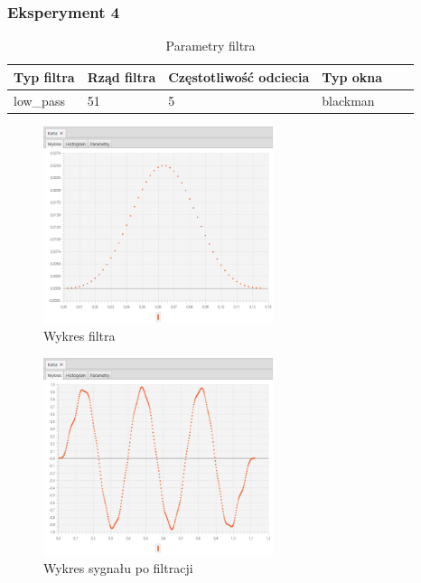 \documentclass[12pt]{article}
\begin{document}
{{            \subsubsection{Eksperyment 4} {
                \begin{table}[H]
                \centering
                \begin{tabular}{|l|l|l|l|l|l|}
                \hline
                Typ filtra & Rząd filtra & Częstotliwość odciecia & Typ okna  \\\hline
                low\_pass & 51 & 5 & blackman     \\\hline
                \end{tabular}
                \caption{Parametry filtra}
                \end{table}
                \begin{figure}[H]
                \centering
                \includegraphics[width=0.6\textwidth]{img/result/filter/experiment04/data_draw_1d_filter_data_113501.png}
                \caption{Wykres filtra}
                \end{figure}

                \begin{figure}[H]
                \centering
                \includegraphics[width=0.6\textwidth]{img/result/filter/experiment04/data_draw_1d_result_data_113504.png}
                \caption{Wykres sygnału po filtracji}
                \end{figure}
            }
            \newpage

}}
\end{document}
